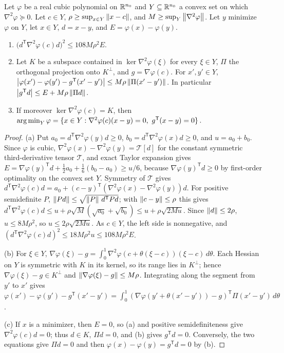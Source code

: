 \begin{lemma}
\label{lem:recourse-transverse}
Let $\varphi$ be a real cubic polynomial on $\mathbb R^{n_0}$ and $Y\subseteq\mathbb R^{n_0}$
a convex set on which $\nabla^2\varphi\succeq0$. Let $c\in Y$,
$\rho\ge\sup_{x\in Y}\left\lVert x-c\right\rVert$, and $M\ge\sup_Y\left\lVert\nabla^2\varphi\right\rVert$.
Let $y$ minimize $\varphi$ on $Y$, let $x\in Y$, $d=x-y$, and
$E=\varphi(x)-\varphi(y)$.
\begin{enumerate}[label=(\alph*)]
\item $\bigl(d^{\mathsf T}\nabla^2\varphi(c)d\bigr)^2\le108M\rho^2E$.
\item Let $K$ be a subspace contained in $\ker\nabla^2\varphi(\xi)$ for
every $\xi\in Y$, $\Pi$ the orthogonal projection onto $K^\perp$, and
$g=\nabla\varphi(c)$. For $x',y'\in Y$,
$\left\lvert\varphi(x')-\varphi(y')-g^{\mathsf T}(x'-y')\right\rvert\le M\rho\left\lVert\Pi(x'-y')\right\rVert$.
In particular $\left\lvert g^{\mathsf T}d\right\rvert\le E+M\rho\left\lVert\Pi d\right\rVert$.
\item If moreover $\ker\nabla^2\varphi(c)=K$, then
$\operatorname*{arg\,min}_Y\varphi=\{x\in Y:\nabla^2\varphi(c)(x-y)=0,\ g^{\mathsf T}(x-y)=0\}$.
\end{enumerate}
\end{lemma}

\begin{proof}
(a) Put $a_0=d^{\mathsf T}\nabla^2\varphi(y)d\ge0$,
$b_0=d^{\mathsf T}\nabla^2\varphi(x)d\ge0$, and $u=a_0+b_0$. Since
$\varphi$ is cubic, $\nabla^2\varphi(x)-\nabla^2\varphi(y)=\mathcal T[d]$
for the constant symmetric third-derivative tensor $\mathcal T$, and
exact Taylor expansion gives
$E=\nabla\varphi(y)^{\mathsf T}d+\frac12a_0+\frac16(b_0-a_0)\ge u/6$,
because $\nabla\varphi(y)^{\mathsf T}d\ge0$ by first-order optimality on
the convex set $Y$. Symmetry of $\mathcal T$ gives
$d^{\mathsf T}\nabla^2\varphi(c)d=a_0+(c-y)^{\mathsf T}
(\nabla^2\varphi(x)-\nabla^2\varphi(y))d$. For positive semidefinite
$P$, $\left\lVert Pd\right\rVert\le\sqrt{\left\lVert P\right\rVert\,d^{\mathsf T}Pd}$; with
$\left\lVert c-y\right\rVert\le\rho$ this gives
$d^{\mathsf T}\nabla^2\varphi(c)d\le u+\rho\sqrt M(\sqrt{a_0}+\sqrt{b_0})
\le u+\rho\sqrt{2Mu}$. Since $\left\lVert d\right\rVert\le2\rho$, $u\le8M\rho^2$, so
$u\le2\rho\sqrt{2Mu}$. As $c\in Y$, the left side is nonnegative, and
$(d^{\mathsf T}\nabla^2\varphi(c)d)^2\le18M\rho^2u\le108M\rho^2E$.

(b) For $\xi\in Y$, $\nabla\varphi(\xi)-g=\int_0^1\nabla^2\varphi(c+\theta(\xi-c))
(\xi-c)\,d\theta$. Each Hessian on $Y$ is symmetric with $K$ in its
kernel, so its range lies in $K^\perp$; hence $\nabla\varphi(\xi)-g\in
K^\perp$ and $\left\lVert\nabla\varphi(\xi)-g\right\rVert\le M\rho$. Integrating along
the segment from $y'$ to $x'$ gives
$\varphi(x')-\varphi(y')-g^{\mathsf T}(x'-y')=\int_0^1
(\nabla\varphi(y'+\theta(x'-y'))-g)^{\mathsf T}\Pi(x'-y')\,d\theta$.

(c) If $x$ is a minimizer, then $E=0$, so (a) and positive
semidefiniteness give $\nabla^2\varphi(c)d=0$; thus $d\in K$, $\Pi d=0$,
and (b) gives $g^{\mathsf T}d=0$. Conversely, the two equations give
$\Pi d=0$ and then $\varphi(x)-\varphi(y)=g^{\mathsf T}d=0$ by (b).
\end{proof}

